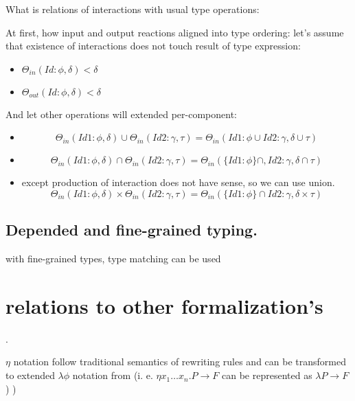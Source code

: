 \documentclass[10pt]{article}
\begin{document}
What is relations of interactions with usual type operations:

At first, how input and output reactions aligned into type ordering: let's assume that
 existence of interactions does not touch result of type expression:

\begin{itemize}
    \item $\Theta_{in}(Id:\phi,\delta)  < \delta$
    \item $\Theta_{out}(Id:\phi,\delta)  < \delta$
\end{itemize}    

 And let other operations will extended per-component:

\begin{itemize}
 \item $$
    \Theta_{in}(Id1:\phi,\delta) \cup \Theta_{in}(Id2:\gamma,\tau) =
         \Theta_{in}( {Id1:\phi}\cup{Id2:\gamma} , \delta \cup \tau)
       $$
 \item $$
    \Theta_{in}(Id1:\phi,\delta) \cap \Theta_{in}(Id2:\gamma,\tau) =
         \Theta_{in}(\{ Id1:\phi \}\cap,{Id2: \gamma}, \delta \cap \tau)
       $$       
 \item except production of interaction does not have sense, so we can use union. 
     $$
    \Theta_{in}(Id1:\phi,\delta) \times \Theta_{in}(Id2:\gamma,\tau) =
         \Theta_{in}(\{ Id1:\phi \}\cap{Id2: \gamma}, \delta \times \tau)
       $$                     
\end{itemize}
 
 



\subsection{ Depended and fine-grained typing. }
 with fine-grained types, type matching can be used  
 
  


\section{relations to other formalization's }.

 $\eta$ notation follow traditional semantics of rewriting rules and can be transformed to extended $\lambda\phi$ notation from \cite{Oostrom90lambdacalculus}
 (i. e.  $\eta x_{1}\dots x_{n}. P \to F$ can be represented as 
   $\lambda P \to F$)
)
   

\

 
\end{document}
